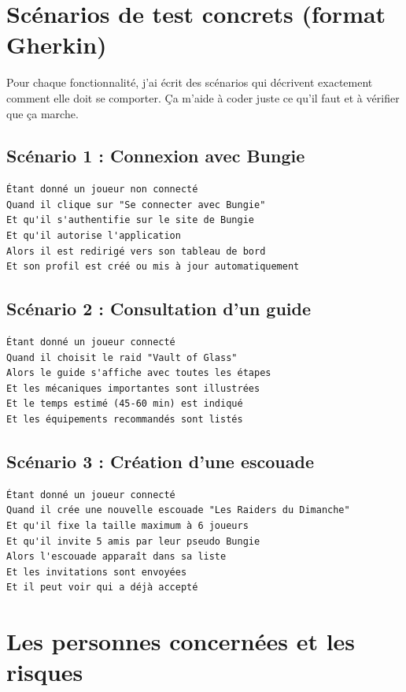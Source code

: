 \section{Scénarios de test concrets (format Gherkin)}

Pour chaque fonctionnalité, j'ai écrit des scénarios qui décrivent exactement comment elle doit se comporter. Ça m'aide à coder juste ce qu'il faut et à vérifier que ça marche.

\subsection*{Scénario 1 : Connexion avec Bungie}
\begin{verbatim}
Étant donné un joueur non connecté
Quand il clique sur "Se connecter avec Bungie"
Et qu'il s'authentifie sur le site de Bungie
Et qu'il autorise l'application
Alors il est redirigé vers son tableau de bord
Et son profil est créé ou mis à jour automatiquement
\end{verbatim}

\subsection*{Scénario 2 : Consultation d'un guide}
\begin{verbatim}
Étant donné un joueur connecté
Quand il choisit le raid "Vault of Glass"
Alors le guide s'affiche avec toutes les étapes
Et les mécaniques importantes sont illustrées
Et le temps estimé (45-60 min) est indiqué
Et les équipements recommandés sont listés
\end{verbatim}

\subsection*{Scénario 3 : Création d'une escouade}
\begin{verbatim}
Étant donné un joueur connecté
Quand il crée une nouvelle escouade "Les Raiders du Dimanche"
Et qu'il fixe la taille maximum à 6 joueurs
Et qu'il invite 5 amis par leur pseudo Bungie
Alors l'escouade apparaît dans sa liste
Et les invitations sont envoyées
Et il peut voir qui a déjà accepté
\end{verbatim}

\section{Les personnes concernées et les risques}


